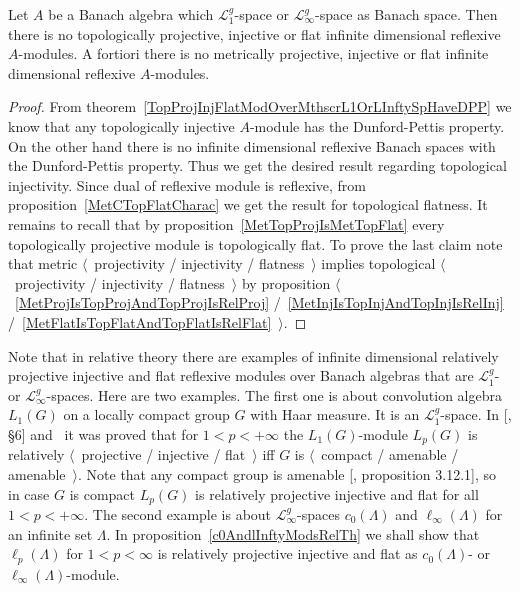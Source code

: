 \begin{corollary}\label{NoInfDimRefMetTopProjInjFlatModOverMthscrL1OrLInfty} Let
$A$ be a Banach algebra which $\mathscr{L}_1^g$-space or
$\mathscr{L}_\infty^g$-space as Banach space. Then there is no topologically
projective, injective or flat infinite dimensional reflexive $A$-modules. A
fortiori there is no metrically projective, injective or flat infinite
dimensional reflexive $A$-modules.
\end{corollary}
\begin{proof} From theorem~\ref{TopProjInjFlatModOverMthscrL1OrLInftySpHaveDPP}
we know that any topologically injective $A$-module has the Dunford-Pettis
property. On the other hand there is no infinite dimensional reflexive Banach
spaces with the Dunford-Pettis property. Thus we get the desired result
regarding topological injectivity. Since dual of reflexive module is reflexive,
from proposition~\ref{MetCTopFlatCharac} we get the result for topological
flatness. It remains to recall that by proposition~\ref{MetTopProjIsMetTopFlat}
every topologically projective module is topologically flat. To prove the last
claim note that metric $\langle$~projectivity / injectivity / flatness~$\rangle$
implies topological $\langle$~projectivity / injectivity / flatness~$\rangle$ by
proposition $\langle$~\ref{MetProjIsTopProjAndTopProjIsRelProj}
/~\ref{MetInjIsTopInjAndTopInjIsRelInj}
/~\ref{MetFlatIsTopFlatAndTopFlatIsRelFlat}~$\rangle$.
\end{proof}

Note that in relative theory there are examples of infinite dimensional
relatively projective injective and flat reflexive modules over Banach algebras
that are $\mathscr{L}_1^g$- or $\mathscr{L}_\infty^g$-spaces. Here are two
examples. The first one is about convolution algebra $L_1(G)$ on a locally
compact group $G$ with Haar measure. It is an $\mathscr{L}_1^g$-space. In
[\cite{DalPolHomolPropGrAlg}, \S6] and~\cite{RachInjModAndAmenGr} it was proved
that for $1<p<+\infty$ the $L_1(G)$-module $L_p(G)$ is relatively
$\langle$~projective / injective / flat~$\rangle$ iff $G$ is $\langle$~compact /
amenable / amenable~$\rangle$. Note that any compact group is amenable
[\cite{PierAmenLCA}, proposition 3.12.1], so in case $G$ is compact $L_p(G)$ is
relatively projective injective and flat for all $1<p<+\infty$.  The second
example is about $\mathscr{L}_\infty^g$-spaces $c_0(\Lambda)$ and
$\ell_\infty(\Lambda)$ for an infinite set $\Lambda$. In
proposition~\ref{c0AndlInftyModsRelTh} we shall show that $\ell_p(\Lambda)$ for
$1<p<\infty$ is relatively projective injective and flat as $c_0(\Lambda)$- or
$\ell_\infty(\Lambda)$-module. 


